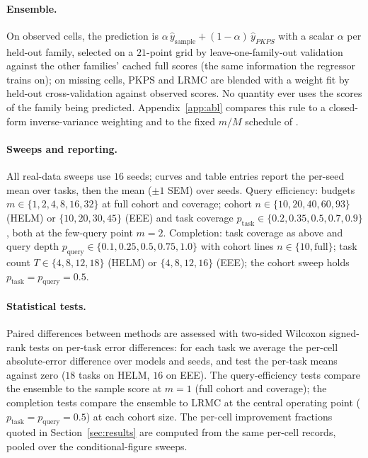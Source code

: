 \documentclass{article}
\theoremstyle{definition}
\theoremstyle{remark}
\theoremstyle{plain}
\newcommand{\PKPS}{PKPS\xspace}
\begin{document}
\paragraph{Ensemble.} On observed cells, the prediction is $\alpha\,\hat
y_{\mathrm{sample}}+(1-\alpha)\,\hat y_{\PKPS}$ with a scalar $\alpha$ per held-out
family, selected on a $21$-point grid by leave-one-family-out validation against the
other families' cached full scores (the same information the regressor trains on); on
missing cells, \PKPS and LRMC are blended with a weight fit by held-out cross-validation
against observed scores. No quantity ever uses the scores of the family being predicted.
Appendix~\ref{app:abl} compares this rule to a closed-form inverse-variance weighting
and to the fixed $m/M$ schedule of \citet{dkps_qeff}.

\paragraph{Sweeps and reporting.}\begin{sloppypar} All real-data sweeps use $16$ seeds; curves and table
entries report the per-seed mean over tasks, then the mean ($\pm1$ SEM) over seeds. Query
efficiency: budgets $m\in\{1,2,4,8,16,32\}$ at full cohort and coverage; cohort
$n\in\{10,20,40,60,93\}$ (HELM) or $\{10,20,30,45\}$ (EEE) and task coverage
$p_{\mathrm{task}}\in\{0.2,0.35,0.5,0.7,0.9\}$, both at the few-query point $m{=}2$.
Completion: task coverage as above and query depth
$p_{\mathrm{query}}\in\{0.1,0.25,0.5,0.75,1.0\}$ with cohort lines $n\in\{10,\text{full}\}$;
task count $T\in\{4,8,12,18\}$ (HELM) or $\{4,8,12,16\}$ (EEE); the cohort sweep holds
$p_{\mathrm{task}}{=}p_{\mathrm{query}}{=}0.5$.\end{sloppypar}

\paragraph{Statistical tests.} Paired differences between methods are assessed with
two-sided Wilcoxon signed-rank tests on per-task error differences: for each task we
average the per-cell absolute-error difference over models and seeds, and test the
per-task means against zero ($18$ tasks on HELM, $16$ on EEE).
The query-efficiency tests compare the ensemble to the sample score at $m{=}1$ (full
cohort and coverage); the completion tests compare the ensemble to LRMC at the
central operating point ($p_{\mathrm{task}}{=}p_{\mathrm{query}}{=}0.5$) at each
cohort size.
The per-cell improvement fractions quoted in Section~\ref{sec:results} are computed
from the same per-cell records, pooled over the conditional-figure sweeps.
\end{document}
